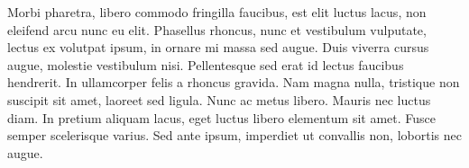 Morbi pharetra, libero commodo fringilla faucibus, est elit luctus lacus, non eleifend arcu nunc eu elit. Phasellus rhoncus, nunc et vestibulum vulputate, lectus ex volutpat ipsum, in ornare mi massa sed augue. Duis viverra cursus augue, molestie vestibulum nisi. Pellentesque sed erat id lectus faucibus hendrerit. In ullamcorper felis a rhoncus gravida. Nam magna nulla, tristique non suscipit sit amet, laoreet sed ligula. Nunc ac metus libero. Mauris nec luctus diam. In pretium aliquam lacus, eget luctus libero elementum sit amet. Fusce semper scelerisque varius. Sed ante ipsum, imperdiet ut convallis non, lobortis nec augue.



